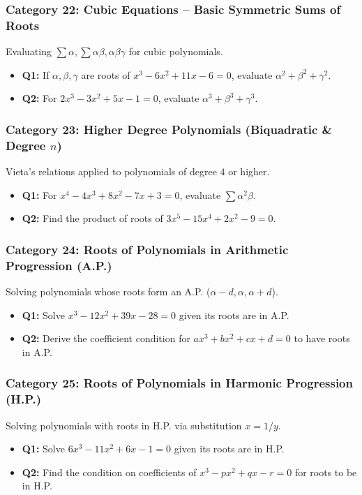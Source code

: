 \documentclass[10pt,a4paper]{article}
\begin{document}
\subsubsection{Category 22: Cubic Equations – Basic Symmetric Sums of Roots}
Evaluating $\sum \alpha, \sum \alpha\beta, \alpha\beta\gamma$ for cubic polynomials.
\begin{itemize}[leftmargin=*]
    \item \textbf{Q1:} If $\alpha, \beta, \gamma$ are roots of $x^3 - 6x^2 + 11x - 6 = 0$, evaluate $\alpha^2 + \beta^2 + \gamma^2$.
    \item \textbf{Q2:} For $2x^3 - 3x^2 + 5x - 1 = 0$, evaluate $\alpha^3 + \beta^3 + \gamma^3$.
\end{itemize}

\subsubsection{Category 23: Higher Degree Polynomials (Biquadratic \& Degree $n$)}
Vieta's relations applied to polynomials of degree $4$ or higher.
\begin{itemize}[leftmargin=*]
    \item \textbf{Q1:} For $x^4 - 4x^3 + 8x^2 - 7x + 3 = 0$, evaluate $\sum \alpha^2 \beta$.
    \item \textbf{Q2:} Find the product of roots of $3x^5 - 15x^4 + 2x^2 - 9 = 0$.
\end{itemize}

\subsubsection{Category 24: Roots of Polynomials in Arithmetic Progression (A.P.)}
Solving polynomials whose roots form an A.P. ($\alpha - d, \alpha, \alpha + d$).
\begin{itemize}[leftmargin=*]
    \item \textbf{Q1:} Solve $x^3 - 12x^2 + 39x - 28 = 0$ given its roots are in A.P.
    \item \textbf{Q2:} Derive the coefficient condition for $ax^3 + bx^2 + cx + d = 0$ to have roots in A.P.
\end{itemize}

\subsubsection{Category 25: Roots of Polynomials in Harmonic Progression (H.P.)}
Solving polynomials with roots in H.P. via substitution $x = 1/y$.
\begin{itemize}[leftmargin=*]
    \item \textbf{Q1:} Solve $6x^3 - 11x^2 + 6x - 1 = 0$ given its roots are in H.P.
    \item \textbf{Q2:} Find the condition on coefficients of $x^3 - px^2 + qx - r = 0$ for roots to be in H.P.
\end{itemize}
\end{document}

